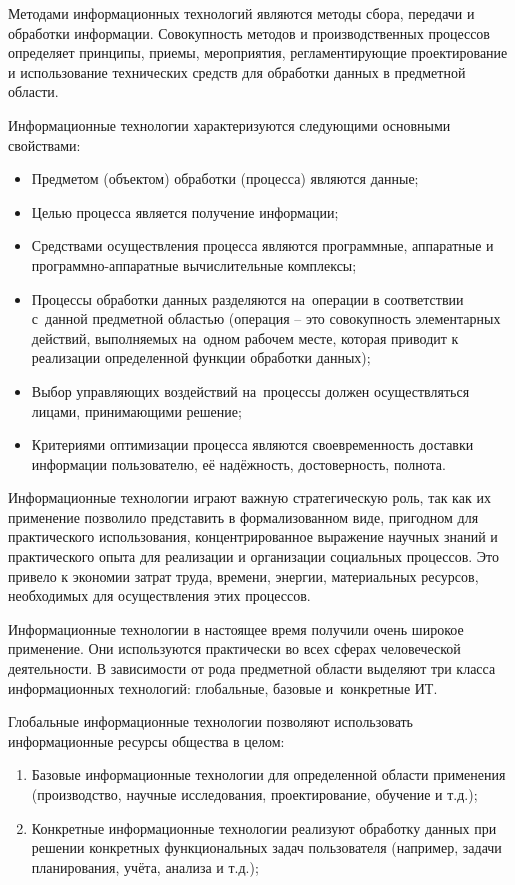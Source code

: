 \documentclass{ou}
\begin{document}
Методами информационных технологий являются методы сбора, передачи и обработки информации. Совокупность методов и производственных процессов определяет принципы, приемы, мероприятия, регламентирующие проектирование и использование технических средств для обработки данных в предметной области.

Информационные технологии характеризуются следующими основными свойствами:
\begin{itemize}[label=-, itemindent=4em, nosep]
    \item Предметом (объектом) обработки (процесса) являются данные;
    \item Целью процесса является получение информации;
    \item Средствами осуществления процесса являются программные, аппаратные и программно-аппаратные вычислительные комплексы;
    \item Процессы обработки данных разделяются на~операции в соответствии с~данной предметной областью (операция -- это совокупность элементарных действий, выполняемых на~одном рабочем месте, которая приводит к реализации определенной функции обработки данных);
    \item Выбор управляющих воздействий на~процессы должен осуществляться лицами, принимающими решение;
    \item Критериями оптимизации процесса являются своевременность доставки информации пользователю, её надёжность, достоверность, полнота.
\end{itemize}

Информационные технологии играют важную стратегическую роль, так как их применение позволило представить в формализованном виде, пригодном для практического использования, концентрированное выражение научных знаний и практического опыта для реализации и организации социальных процессов. Это привело к экономии затрат труда, времени, энергии, материальных ресурсов, необходимых для осуществления этих процессов.

Информационные технологии в настоящее время получили очень широкое применение. Они используются практически во всех сферах человеческой деятельности. В зависимости от рода предметной области выделяют три класса информационных технологий: глобальные, базовые и~конкретные ИТ.

Глобальные информационные технологии позволяют использовать информационные ресурсы общества в целом:
\begin{enumerate}[itemindent=4em, nosep, label=\arabic*)]
    \item Базовые информационные технологии для определенной области применения (производство, научные исследования, проектирование, обучение и т.д.);
    \item Конкретные информационные технологии реализуют обработку данных при решении конкретных функциональных задач пользователя (например, задачи планирования, учёта, анализа и т.д.);
\end{enumerate}
\end{document}

